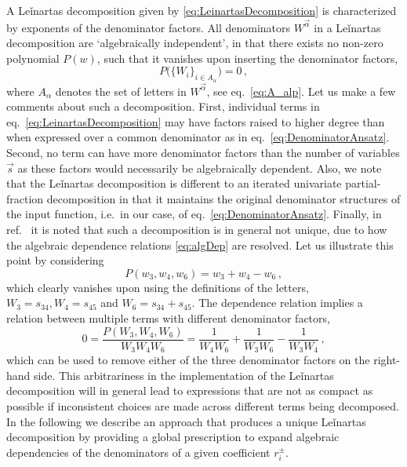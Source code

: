 A Leǐnartas decomposition given by \cref{eq:LeinartasDecomposition}
is characterized by exponents of the denominator factors. 
All denominators $W^{\vec \alpha}$
in a Leǐnartas decomposition  are `algebraically independent', in that
there exists no non-zero polynomial  
$P(w)$, such that it vanishes upon inserting the denominator factors, 
\begin{equation}\label{eq:algDep}
P\big(\{ W_i \}_{i\in A_\alpha}\big )=0\,,
\end{equation}
where $A_\alpha$ denotes the set of letters in $W^{\vec \alpha}$, see eq.~\eqref{eq:A_alp}.
Let us make a few comments about such a decomposition.  First, individual terms
in eq.~\eqref{eq:LeinartasDecomposition} may have factors raised to higher
degree than when expressed over a common denominator as in 
eq.~\eqref{eq:DenominatorAnsatz}. Second, no term can have
more denominator factors than the number of variables $\vec s$ as these factors would
necessarily be algebraically dependent.  Also, we note that the Leǐnartas
decomposition is different to an iterated univariate partial-fraction decomposition in that
it maintains the original denominator structures of the input 
function, i.e.\  in our case, of eq.~\eqref{eq:DenominatorAnsatz}. Finally, in
ref.~\cite{raichev2012leinartas} it is noted that such a
decomposition is in general not unique, due to how the algebraic dependence relations
\eqref{eq:algDep} are resolved.
Let us illustrate this point by considering
\begin{equation} 
P(w_3,w_4,w_6)=w_3 + w_4 - w_6\,,
\end{equation} 
which clearly vanishes upon 
using the definitions of the letters, 
$W_3=s_{34}, W_4=s_{45} $ and 
$W_6 =s_{34} + s_{45}$. 
The dependence relation implies a relation between multiple terms with different denominator factors,
\begin{equation}\label{eq:arbitraryLeinartas}
0= \frac{P(W_3,W_4,W_6)}{W_3 W_4 W_6} 
= \frac{1}{W_4 W_6} + \frac{1}{W_3 W_6} - \frac{1}{W_3 W_4}\,, 
\end{equation}
which can be used to remove either of the three denominator factors on the right-hand side.
This arbitrariness in the implementation of the Leǐnartas decomposition will
in general lead to expressions that are not as compact as possible if inconsistent choices
are made across different terms being decomposed.
In the following we describe
an approach that produces a unique Leǐnartas decomposition by providing 
a global prescription to expand algebraic dependencies of the denominators of a given
coefficient $r_i^{\pm}$.

